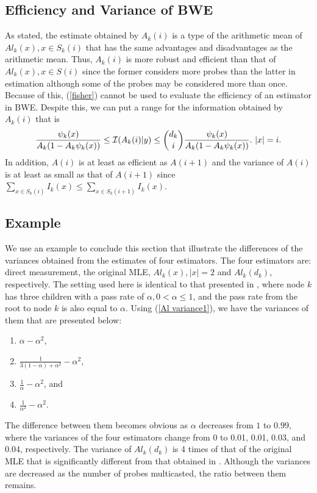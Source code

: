 \documentclass[10pt,onecolumn]{IEEEtran}
\begin{document}
\subsection{Efficiency and Variance of BWE}

As stated, the estimate obtained by $A_k(i)$ is a type of the arithmetic mean of $Al_k(x), x \in S_k(i)$ that has the same advantages and disadvantages as the arithmetic mean. Thus, $A_k(i)$ is more robust and efficient than that of $Al_k(x), x \in S(i)$ since the former considers more probes than the latter in estimation although some of the probes may be considered more than once. Because of this, (\ref{fisher}) cannot be used to evaluate the efficiency of an estimator in BWE. Despite this, we can put a range for the information obtained by $A_k(i)$ that is
 \begin{eqnarray}
\frac{\psi_k(x)}{A_k(1-A_k\psi_k(x))} \leq {\cal I}(A_k(i)|y) \leq  {d_k \choose i} \frac{\psi_k(x)}{A_k(1-A_k\psi_k(x))}.  \mbox{    } |x|=i.
 \end{eqnarray}
In addition, $A(i)$ is at least as efficient as $A(i+1)$ and the variance of $A(i)$ is at least as small as that of $A(i+1)$ since $\sum_{x \in S_k(i)} I_k(x) \leq \sum_{x \in S_k(i+1)} I_k(x)$.



\subsection{Example}
We use an example to conclude this section that illustrate the differences of the variances obtained from the estimates of four estimators. The four estimators are: direct measurement, the original MLE, $Al_k(x), |x|=2$ and $Al_k(d_k)$, respectively. The setting used here is identical to that presented in \cite{DHPT06}, where node $k$ has three children with a pass
rate of $\alpha, 0 < \alpha \leq 1$, and the pass rate from the root to node $k$ is also equal to $\alpha$.  Using (\ref{Al variance1}), we have the variances of them that are presented below:
\begin{enumerate}
\item $\alpha-\alpha^2$,
\item $\frac{1}{3(1-\alpha)+\alpha^2}-\alpha^2$,
\item $\frac{1}{\alpha}-\alpha^2$, and
\item $\frac{1}{\alpha^2}-\alpha^2$.
\end{enumerate}
The difference between them becomes obvious as $\alpha$ decreases from $1$ to  $0.99$, where the variances of the four estimators change from 0 to 0.01, 0.01, 0.03, and 0.04, respectively. The variance of $Al_k(d_k)$ is 4 times of that of the original MLE that is significantly different from that obtained in \cite{DHPT06}. Although the variances are decreased as the number of probes multicasted, the ratio between them remains.
\end{document}
